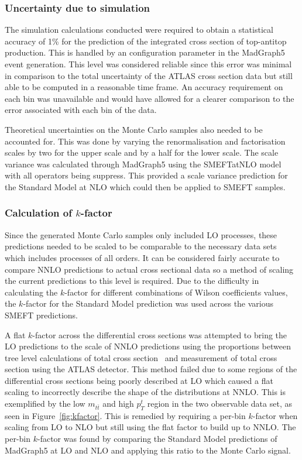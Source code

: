\documentclass[a4paper,11pt]{article}
\begin{document}
\subsubsection{Uncertainty due to simulation}\label{sec:scale_variance}

The simulation calculations conducted were required to obtain a statistical accuracy of 1\% for the prediction of the integrated cross section of top-antitop production.
This is handled by an configuration parameter in the MadGraph5 event generation.
This level was considered reliable since this error was minimal in comparison to the total uncertainty of the ATLAS cross section data but still able to be computed in a reasonable time frame.
An accuracy requirement on each bin was unavailable and would have allowed for a clearer comparison to the error associated with each bin of the data.

Theoretical uncertainties on the Monte Carlo samples also needed to be accounted for.
This was done by varying the renormalisation and factorisation scales by two for the upper scale and by a half for the lower scale.
The scale variance was calculated through MadGraph5 using the SMEFTatNLO model with all operators being suppress.
This provided a scale variance prediction for the Standard Model at NLO which could then be applied to SMEFT samples.

\subsubsection{Calculation of \texorpdfstring{$k$}{k}-factor}
Since the generated Monte Carlo samples only included LO processes, these predictions needed to be scaled to be comparable to the necessary data sets which includes processes of all orders.
It can be considered fairly accurate to compare NNLO predictions to actual cross sectional data so a method of scaling the current predictions to this level is required.
Due to the difficulty in calculating the $k$-factor for different combinations of Wilson coefficients values, the $k$-factor for the Standard Model prediction was used across the various SMEFT predictions.

A flat $k$-factor across the differential cross sections was attempted to bring the LO predictions to the scale of NNLO predictions using the proportions between tree level calculations of total cross section~\cite{Alwall_2014} and measurement of total cross section using the ATLAS detector.
This method failed due to some regions of the differential cross sections being poorly described at LO which caused a flat scaling to incorrectly describe the shape of the distributions at NNLO.
This is exemplified by the low $m_{t\bar{t}}$ and high $p_{T}^{t}$ region in the two observable data set, as seen in Figure~\ref{fig:kfactor}.
This is remedied by requiring a per-bin $k$-factor when scaling from LO to NLO but still using the flat factor to build up to NNLO.
The per-bin $k$-factor was found by comparing the Standard Model predictions of MadGraph5 at LO and NLO and applying this ratio to the Monte Carlo signal.
\end{document}
